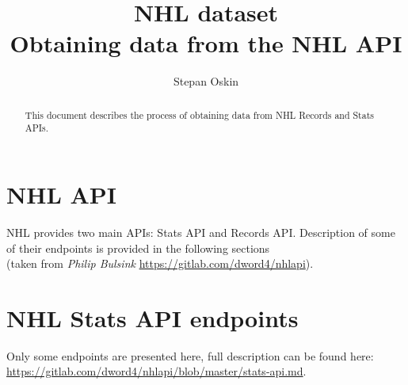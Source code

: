 \documentclass[11pt]{article}
\begin{document}
    \title{NHL dataset \\
    Obtaining data from the NHL API}

    \author{Stepan Oskin}

    \maketitle

    \begin{abstract}
        This document describes the process of obtaining data from NHL Records and Stats APIs.
    \end{abstract}

    \section{NHL API} \label{sec:nhl_api}

    NHL provides two main APIs: Stats API and Records API\@.
    Description of some of their endpoints is provided in the following sections \\
    (taken from \textit{Philip Bulsink} \url{https://gitlab.com/dword4/nhlapi}).


    \section{NHL Stats API endpoints} \label{sec:nhl_stats}

    Only some endpoints are presented here, full description can be found here: \url{https://gitlab.com/dword4/nhlapi/blob/master/stats-api.md}.
\end{document}
